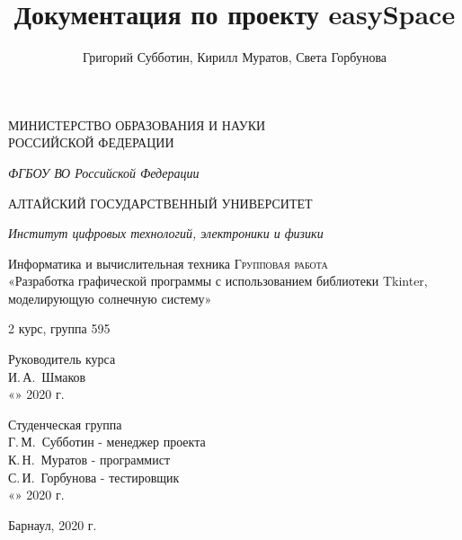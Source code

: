 \documentclass[11pt,a4paper]{report}
\author{Григорий Субботин, Кирилл Муратов, Света Горбунова}
\title{Документация по проекту easySpace}
\begin{document}
\begin{titlepage}
 \begin{center}
    \large
    МИНИСТЕРСТВО ОБРАЗОВАНИЯ И НАУКИ\\ РОССИЙСКОЙ ФЕДЕРАЦИИ
     
    \textit{ФГБОУ ВО Российской Федерации}
    \vspace{0.5cm}
 
    АЛТАЙСКИЙ ГОСУДАРСТВЕННЫЙ УНИВЕРСИТЕТ
    
    \vspace{0.25cm}
     
    \textit{Институт цифровых технологий, электроники и физики}
    
    \vfill 
    Информатика и вычислительная техника
    \vfill
    \textsc{Групповая работа}\\[5mm]
     
    {\LARGE «Разработка графической программы с использованием библиотеки Tkinter, моделирующую солнечную систему»}
  \bigskip
     
     2 курс, группа 595
\end{center}
\vfill
 
\newlength{\ML}
\hfill\begin{minipage}{0.4\textwidth}
  Руководитель курса\\
  \underline{\hspace{\ML}} И.\,А.~Шмаков\\
  «\underline{\hspace{0.5cm}}» \underline{\hspace{1cm}} 2020 г.
\end{minipage}%
\bigskip
 
\hfill\begin{minipage}{0.4\textwidth}
  Студенческая группа\\
  \underline{\hspace{\ML}} Г.\,М.~Субботин - менеджер проекта\\
  \underline{\hspace{\ML}} К.\,Н.~Муратов - программист\\
  \underline{\hspace{\ML}} С.\,И.~Горбунова - тестировщик\\
  «\underline{\hspace{0.5cm}}» \underline{\hspace{1cm}} 2020 г.
\end{minipage}%
\vfill
 
\begin{center}
  Барнаул, 2020 г.
\end{center}
\end{titlepage}
\end{document}
